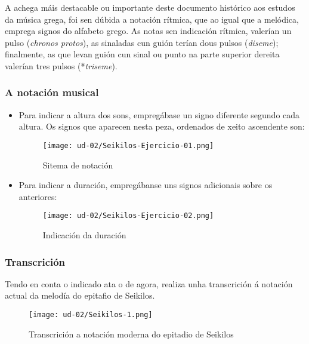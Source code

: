 A achega máis destacable ou importante deste documento histórico aos estudos da música grega, foi sen dúbida a notación rítmica, que ao igual que a melódica, emprega signos do alfabeto grego. As notas sen indicación rítmica, valerían un pulso (\textit{chronos protos}), as sinaladas cun guión terían dous pulsos (\textit{diseme}); finalmente, as que levan guión cun sinal ou punto na parte superior dereita valerían tres pulsos (*\textit{triseme}).

\subsubsection*{A notación musical}

\begin{itemize}
\item Para indicar a altura dos sons, empregábase un signo diferente segundo cada altura. Os signos que aparecen nesta peza, ordenados de xeito ascendente son:

	\begin{figure}[htp]
	\centering
	\texttt{[image: ud-02/Seikilos-Ejercicio-01.png]}
	\caption{Sitema de notación}
	\label{seikilos-sistema}
	\end{figure}
	
\item Para indicar a duración, empregábanse uns signos adicionais sobre os anteriores:
	\begin{figure}[htp]
	\centering
	\texttt{[image: ud-02/Seikilos-Ejercicio-02.png]}
	\caption{Indicación da duración}
	\label{seikilos-duracion}
	\end{figure}
	
\end{itemize}

\subsubsection*{Transcrición}

Tendo en conta o indicado ata o de agora, realiza unha transcrición á notación actual da melodía do epitafio de Seikilos.

\begin{figure}[htp]
\centering
\texttt{[image: ud-02/Seikilos-1.png]}
\caption{Transcrición a notación moderna do epitadio de Seikilos}
\label{transcricion}
\end{figure}
